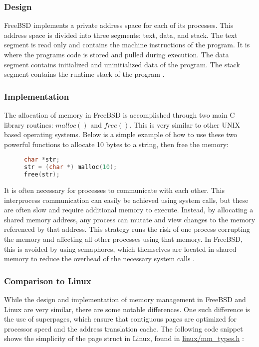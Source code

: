 \documentclass[letterpaper,draftclsnofoot,10pt,onecolumn,titlepage]{IEEEtran}\usepackage[margin=0.75in]{geometry}
\begin{document}
        \subsubsection{Design}
        FreeBSD implements a private address space for each of its processes. This address space is divided into three 
        segments: text, data, and stack. The text segment is read only and contains the machine instructions of 
        the program. It is where the programs code is stored and pulled during execution. The data segment 
        contains initialized and uninitialized data of the program. The stack segment contains the runtime stack 
        of the program \cite{freebsd}.

        \subsubsection{Implementation}

            The allocation of memory in FreeBSD is accomplished through two main C library routines: $malloc()$ and
            $free()$. This is very similar to other UNIX based operating systems. Below is a simple example of how 
            to use these two powerful functions to allocate 10 bytes to a string, then free the memory:

\begin{figure}[H]
\begin{lstlisting}[language=C++]
char *str;
str = (char *) malloc(10);
free(str);
\end{lstlisting}
\end{figure}

            It is often necessary for processes to communicate with each other. This interprocess communication can 
            easily be achieved using system calls, but these are often slow and require additional memory to execute.
            Instead, by allocating a shared memory address, any process can mutate and view changes to the memory 
            referenced by that address. This strategy runs the risk of one process corrupting the memory and affecting
            all other processes using that memory. In FreeBSD, this is avoided by using semaphores, which themselves 
            are located in shared memory to reduce the overhead of the necessary system calls \cite{freebsd}.

        \subsubsection{Comparison to Linux}
        While the design and implementation of memory management in FreeBSD and Linux are very similar, there are 
        some notable differences. One such difference is the use of superpages, which ensure that contiguous pages 
        are optimized for processor speed and the address translation cache. The following code snippet shows the 
        simplicity of the page struct in Linux, found in \url{linux/mm_types.h} \cite{linux}:
\end{document}
